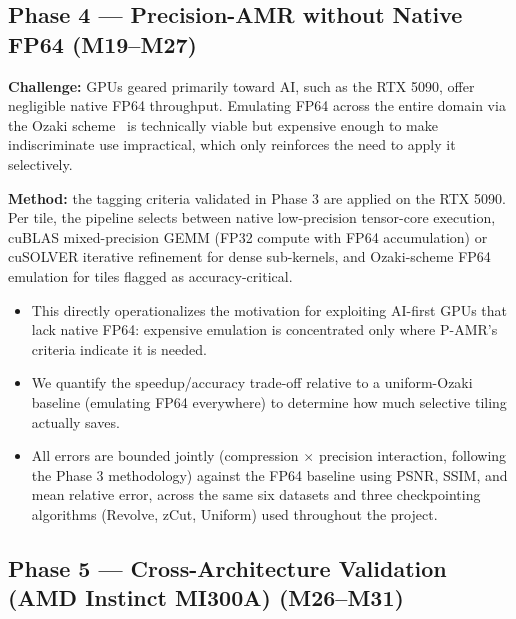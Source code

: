 \documentclass[12pt,a4paper]{article}
\newcommand{\pamr}{P\nobreakdash-AMR}
\begin{document}
\subsection{Phase 4 --- Precision-AMR without Native FP64 (M19--M27)}

\textbf{Challenge:} GPUs geared primarily toward AI, such as the RTX 5090,
offer negligible native FP64 throughput. Emulating FP64 across the entire
domain via the Ozaki scheme~\cite{uchino2025ozaki} is technically viable
but expensive enough to make indiscriminate use impractical, which only
reinforces the need to apply it selectively.

\textbf{Method:} the tagging criteria validated in Phase 3 are applied on
the RTX 5090. Per tile, the pipeline selects between native low-precision
tensor-core execution, cuBLAS mixed-precision GEMM (FP32 compute with
FP64 accumulation) or cuSOLVER iterative refinement for dense sub-kernels,
and Ozaki-scheme FP64 emulation for tiles flagged as accuracy-critical.

\begin{itemize}
  \item This directly operationalizes the motivation for exploiting
        AI-first GPUs that lack native FP64: expensive emulation is
        concentrated only where \pamr{}'s criteria indicate it is needed.
  \item We quantify the speedup/accuracy trade-off relative to a
        uniform-Ozaki baseline (emulating FP64 everywhere) to determine
        how much selective tiling actually saves.
  \item All errors are bounded jointly (compression $\times$ precision
        interaction, following the Phase 3 methodology) against the FP64
        baseline using PSNR, SSIM, and mean relative error, across the
        same six datasets and three checkpointing algorithms (Revolve,
        zCut, Uniform) used throughout the project.
\end{itemize}

\subsection{Phase 5 --- Cross-Architecture Validation (AMD Instinct
MI300A) (M26--M31)}
\end{document}
